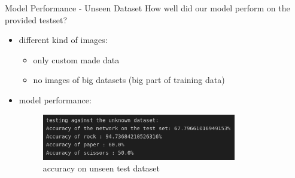 \documentclass[aspectratio=169]{beamer}
\begin{document}
{	\begin{frame}{Model Performance - Unseen Dataset}
		How well did our model perform on the provided testset?
	\begin{itemize}
		\item different kind of images:
		\begin{itemize}
			\item only custom made data
			\item no images of big datasets (big part of training data)
		\end{itemize}
		\pause
		\item model performance:
		\newline
		\begin{figure}
			\centering
			\includegraphics[width=0.8\textwidth]{img/TestAccuracyRPS_unseen_10.png}
			\caption{accuracy on unseen test dataset}
		\end{figure}   
	\end{itemize}
\end{frame}

}
\end{document}
